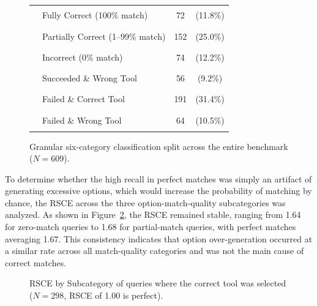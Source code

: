 \begin{figure}[htbp]
\begin{minipage}{0.48\textwidth}
  \scriptsize
  \begin{tabular}{llcc}
    \textcolor{green!80!black}{\rule{1.2ex}{1.2ex}} & Fully Correct (100\% match) & 72 & (11.8\%) \\
    \textcolor{green!60!black}{\rule{1.2ex}{1.2ex}} & Partially Correct (1--99\% match) & 152 & (25.0\%) \\
    \textcolor{green!30!black}{\rule{1.2ex}{1.2ex}} & Incorrect (0\% match) & 74 & (12.2\%) \\
    \textcolor{blue!60!black}{\rule{1.2ex}{1.2ex}} & Succeeded \& Wrong Tool & 56 & (9.2\%) \\
    \textcolor{orange!70!black}{\rule{1.2ex}{1.2ex}} & Failed \& Correct Tool & 191 & (31.4\%) \\
    \textcolor{red!70!black}{\rule{1.2ex}{1.2ex}} & Failed \& Wrong Tool & 64 & (10.5\%) \\
  \end{tabular}
  \vspace{0.2cm}
  \caption{Granular six-category classification split across the entire benchmark ($N=609$).}
  \label{fig:detailed_breakdown}
\end{minipage}
\end{figure}
\FloatBarrier

To determine whether the high recall in perfect matches was simply an artifact of generating excessive options, which would increase the probability of matching by chance, the \ac{RSCE} across the three option-match-quality subcategories was analyzed. As shown in Figure~\ref{fig:rsf_by_subcategory}, the \ac{RSCE} remained stable, ranging from 1.64 for zero-match queries to 1.68 for partial-match queries, with perfect matches averaging 1.67. This consistency indicates that option over-generation occurred at a similar rate across all match-quality categories and was not the main cause of correct matches.

\FloatBarrier

\begin{figure}[htbp]
\centering
\begin{minipage}{0.48\textwidth}
  \centering
  \caption{\ac{RSCE} by Subcategory of queries where the correct tool was selected ($N=298$, \ac{RSCE} of 1.00 is perfect).}
  \label{fig:rsf_by_subcategory}
\end{minipage}
\end{figure}
\FloatBarrier

